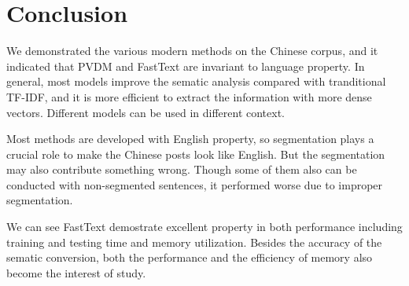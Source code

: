 \section{Conclusion}

We demonstrated the various modern methods on the Chinese corpus, and it indicated that PVDM and FastText are invariant to language property. 
In general, most models improve the sematic analysis compared with tranditional TF-IDF, and it is more efficient to extract the information with more dense vectors.
Different models can be used in different context.

Most methods are developed with English property, so segmentation plays a crucial role to make the Chinese posts look like English.
But the segmentation may also contribute something wrong. Though some of them also can be conducted with non-segmented sentences, it performed worse due to improper segmentation.

We can see FastText demostrate excellent property in both performance including training and testing time and memory utilization. 
Besides the accuracy of the sematic conversion, both the performance and the efficiency of memory also become the interest of study.

